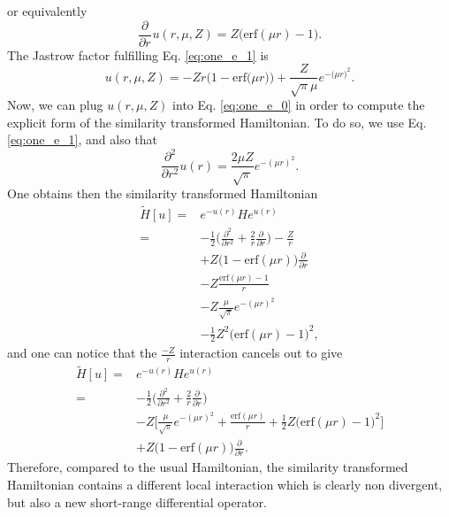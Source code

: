 \documentclass[aip,jcp,reprint,noshowkeys,superscriptaddress]{revtex4-1}
\newcommand{\deriv}[3]{\frac{\partial^{#3} #1}{\partial {#2}^{#3}}}
\begin{document}
or equivalently
\begin{equation}
 \label{eq:one_e_1}
 \deriv{}{r}{}u(r,\mu,Z) = Z\bigg( \text{erf}(\mu r) - 1\bigg).
\end{equation}
The Jastrow factor fulfilling Eq. \eqref{eq:one_e_1} is 
\begin{equation}
 \label{eq:one_e_2}
 u(r,\mu,Z) = -Z r \bigg( 1 - \text{erf}\big(\mu r\big) \bigg) + \frac{Z}{\sqrt{\pi}\mu} e^{-\big(\mu r \big)^2}. 
\end{equation}
Now, we can plug $u(r,\mu,Z)$ into Eq. \eqref{eq:one_e_0} in order to compute the explicit form of the similarity transformed Hamiltonian. 
To do so, we use Eq. \eqref{eq:one_e_1}, and also that 
\begin{equation}
 \deriv{}{r}{2}u(r) = \frac{2 \mu Z }{\sqrt{\pi}} e^{-(\mu r)^2}.
\end{equation}
One obtains then the similarity transformed Hamiltonian 
\begin{equation}
 \begin{aligned}
 \tilde{H}[u] = & e^{-u(r)} H e^{u(r)} \\
              = & -\frac{1}{2}\big( \deriv{}{r}{2} + \frac{2}{r} \deriv{}{r}{} \big) - \frac{Z}{r}  \\
                & + Z \bigg( 1 - \text{erf}(\mu r)\bigg) \deriv{}{r}{} \\
                & - Z \frac{\text{erf}(\mu r) - 1}{r} \\
                & -Z \frac{\mu}{\sqrt{\pi}} e^{-(\mu r)^2} \\
                & - \frac{1}{2}Z^2 \bigg( \text{erf}(\mu r) -1 \bigg)^2,
 \end{aligned}
\end{equation}
and one can notice that the $\frac{-Z}{r}$ interaction cancels out to give
\begin{equation}
 \label{eq:one_e_3}
 \begin{aligned}
 \tilde{H}[u] = & e^{-u(r)} H e^{u(r)} \\
              = & -\frac{1}{2}\big( \deriv{}{r}{2} + \frac{2}{r} \deriv{}{r}{} \big)  \\
                & -Z \bigg[ \frac{\mu}{\sqrt{\pi}} e^{-(\mu r)^2} + \frac{\text{erf}(\mu r)}{r} + \frac{1}{2}Z \bigg( \text{erf}(\mu r) -1 \bigg)^2 \bigg] \\
                & + Z \bigg( 1 - \text{erf}(\mu r)\bigg) \deriv{}{r}{}. 
 \end{aligned}
\end{equation}
Therefore, compared to the usual Hamiltonian, the similarity transformed Hamiltonian contains a different local interaction which is clearly non divergent, but also a new short-range differential operator. 
\end{document}
